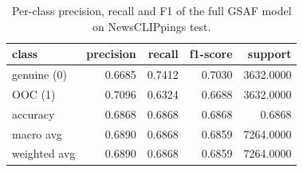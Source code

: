 \begin{table}[!t]
\centering
\caption{Per-class precision, recall and F1 of the full GSAF model on NewsCLIPpings test.}
\label{tab:per_class_nc}
\begin{tabular}{lrrrr}
\toprule
\textbf{class} & \textbf{precision} & \textbf{recall} & \textbf{f1-score} & \textbf{support} \\
\midrule
genuine (0) & 0.6685 & 0.7412 & 0.7030 & 3632.0000 \\
OOC (1) & 0.7096 & 0.6324 & 0.6688 & 3632.0000 \\
accuracy & 0.6868 & 0.6868 & 0.6868 & 0.6868 \\
macro avg & 0.6890 & 0.6868 & 0.6859 & 7264.0000 \\
weighted avg & 0.6890 & 0.6868 & 0.6859 & 7264.0000 \\
\bottomrule
\end{tabular}
\end{table}
